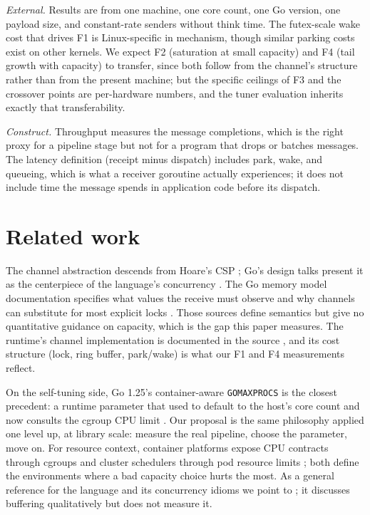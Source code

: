 \documentclass[10pt,a4paper]{article}
\begin{document}
\emph{External.} Results are from one machine, one core count, one Go version,
one payload size, and constant-rate senders without think time. The
futex-scale wake cost that drives F1 is Linux-specific in mechanism, though
similar parking costs exist on other kernels. We expect F2 (saturation at
small capacity) and F4 (tail growth with capacity) to transfer, since both
follow from the channel's structure rather than from the present machine; but
the specific ceilings of F3 and the crossover points are per-hardware numbers,
and the tuner evaluation inherits exactly that transferability.

\emph{Construct.} Throughput measures the message completions, which is the
right proxy for a pipeline stage but not for a program that drops or batches
messages. The latency definition (receipt minus dispatch) includes park, wake,
and queueing, which is what a receiver goroutine actually experiences; it does
not include time the message spends in application code before its dispatch.

\section{Related work}
\label{sec:related}

The channel abstraction descends from Hoare's CSP \cite{hoare}; Go's design
talks present it as the centerpiece of the language's concurrency
\cite{pikepatterns,pikeconc}. The Go memory model documentation specifies what
values the receive must observe and why channels can substitute for most explicit
locks \cite{gomem}. Those sources define semantics but give no quantitative
guidance on capacity, which is the gap this paper measures. The runtime's
channel implementation is documented in the source \cite{goruntime}, and its
cost structure (lock, ring buffer, park/wake) is what our F1 and F4
measurements reflect.

On the self-tuning side, Go 1.25's container-aware \texttt{GOMAXPROCS}
\cite{go125} is the closest precedent: a runtime parameter that used to default
to the host's core count and now consults the cgroup CPU limit \cite{cgrouppv2}.
Our proposal is the same philosophy applied one level up, at library scale:
measure the real pipeline, choose the parameter, move on. For resource context,
container platforms expose CPU contracts through cgroups \cite{cgrouppv2} and
cluster schedulers through pod resource limits \cite{k8sres}; both define the
environments where a bad capacity choice hurts the most. As a general reference
for the language and its concurrency idioms we point to
\cite{gobook}; it discusses buffering qualitatively but does not measure it.
\end{document}
